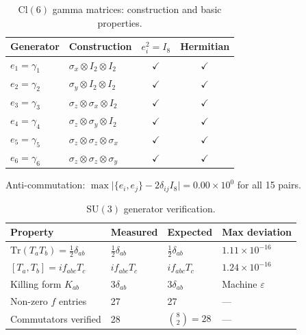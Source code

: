 \documentclass[12pt]{article}
\newcommand{\cl}{\mathrm{Cl}}          %
\newcommand{\su}{\mathrm{SU}}
\newcommand{\tr}{\mathrm{Tr}}
\begin{document}
\begin{table}[ht]
\centering
\caption{$\cl(6)$ gamma matrices: construction and basic properties.}
\label{tab:B1}
\begin{tabular}{@{}llcc@{}}
  \toprule
  \textbf{Generator} & \textbf{Construction}
    & $e_i^2 = I_8$ & \textbf{Hermitian} \\
  \midrule
  $e_1 = \gamma_1$ & $\sigma_x\otimes I_2\otimes I_2$ & $\checkmark$ & $\checkmark$ \\
  $e_2 = \gamma_2$ & $\sigma_y\otimes I_2\otimes I_2$ & $\checkmark$ & $\checkmark$ \\
  $e_3 = \gamma_3$ & $\sigma_z\otimes\sigma_x\otimes I_2$ & $\checkmark$ & $\checkmark$ \\
  $e_4 = \gamma_4$ & $\sigma_z\otimes\sigma_y\otimes I_2$ & $\checkmark$ & $\checkmark$ \\
  $e_5 = \gamma_5$ & $\sigma_z\otimes\sigma_z\otimes\sigma_x$ & $\checkmark$ & $\checkmark$ \\
  $e_6 = \gamma_6$ & $\sigma_z\otimes\sigma_z\otimes\sigma_y$ & $\checkmark$ & $\checkmark$ \\
  \bottomrule
\end{tabular}
\end{table}

\noindent
Anti-commutation: $\max\bigl|\{e_i,e_j\}-2\delta_{ij}I_8\bigr|
= 0.00\times10^{0}$ for all 15 pairs.

\bigskip

\begin{table}[ht]
\centering
\caption{$\su(3)$ generator verification.}
\label{tab:B2}
\begin{tabular}{@{}llll@{}}
  \toprule
  \textbf{Property} & \textbf{Measured} & \textbf{Expected}
    & \textbf{Max deviation} \\
  \midrule
  $\tr(T_a T_b)=\tfrac{1}{2}\delta_{ab}$
    & $\tfrac{1}{2}\delta_{ab}$
    & $\tfrac{1}{2}\delta_{ab}$
    & $1.11\times10^{-16}$ \\
  $[T_a,T_b]=if_{abc}T_c$
    & $if_{abc}T_c$ & $if_{abc}T_c$ & $1.24\times10^{-16}$ \\
  Killing form $K_{ab}$
    & $3\delta_{ab}$ & $3\delta_{ab}$ & Machine $\varepsilon$ \\
  Non-zero $f$ entries & 27 & 27 & --- \\
  Commutators verified & 28 & $\binom{8}{2}=28$ & --- \\
  \bottomrule
\end{tabular}
\end{table}
\end{document}
